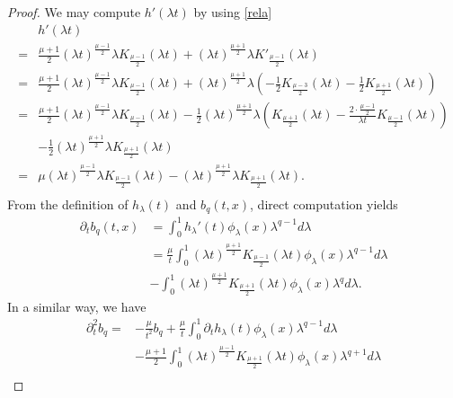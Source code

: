 \documentclass[10pt,a4paper]{amsart}
\begin{document}
\begin{proof}
We may compute $h'(\lambda t)$ by using \eqref{rela}
\begin{equation}\label{dh}
\begin{aligned}
&h'(\lambda t)\\
=&\frac{\mu+1}{2}(\lambda t)^{\frac{\mu-1}{2}}\lambda K_{\frac{\mu-1}{2}}(\lambda t)
+(\lambda t)^{\frac{\mu+1}{2}}\lambda K'_{\frac{\mu-1}{2}}(\lambda t)\\
=&\frac{\mu+1}{2}(\lambda t)^{\frac{\mu-1}{2}}\lambda K_{\frac{\mu-1}{2}}(\lambda t)+(\lambda t)^{\frac{\mu+1}{2}}\lambda
\left(-\frac12K_{\frac{\mu-3}{2}}(\lambda t)-\frac12K_{\frac{\mu+1}{2}}(\lambda t)\right)\\
=&\frac{\mu+1}{2}(\lambda t)^{\frac{\mu-1}{2}}\lambda K_{\frac{\mu-1}{2}}(\lambda t)-\frac12(\lambda t)^{\frac{\mu+1}{2}}\lambda
\left(K_{\frac{\mu+1}{2}}(\lambda t)-\frac{2\cdot\frac{\mu-1}{2}}{\lambda t}
K_{\frac{\mu-1}{2}}(\lambda t)\right)\\
&-\frac12(\lambda t)^{\frac{\mu+1}{2}}\lambda K_{\frac{\mu+1}{2}}(\lambda t)\\
=&\mu (\lambda t)^{\frac{\mu-1}{2}}\lambda K_{\frac{\mu-1}{2}}(\lambda t)-(\lambda t)^{\frac{\mu+1}{2}}\lambda K_{\frac{\mu+1}{2}}(\lambda t).\\
\end{aligned}
\end{equation}
From the definition of $h_\lambda(t)$ and $b_q(t, x)$, direct computation yields
\begin{equation}\label{l41}
\begin{aligned}
\partial_tb_q(t,x)&=\int_{0}^{1}h_\lambda'(t)\phi_\lambda(x)\lambda^{q-1}d\lambda\\
&=\frac{\mu}{t}\int_{0}^{1}(\lambda t)^{\frac{\mu+1}{2}}K_{\frac{\mu-1}{2}}(\lambda t)\phi_\lambda(x)\lambda^{q-1}d\lambda\\
&-\int_{0}^{1}(\lambda t)^{\frac{\mu+1}{2}}K_{\frac{\mu+1}{2}}(\lambda t)\phi_\lambda(x)\lambda^{q}d\lambda.
\end{aligned}
\end{equation}
In a similar way, we have
\begin{equation}\label{l42}
\begin{aligned}
\partial_t^2b_q=&-\frac{\mu}{t^2}b_q+\frac{\mu}t\int_0^1\partial_th_\lambda(t)
\phi_\lambda(x)\lambda^{q-1}d\lambda\\
&-\frac{\mu+1}{2}\int_0^1(\lambda t)^{\frac{\mu-1}{2}}K_{\frac{\mu+1}{2}}(\lambda t)\phi_\lambda(x)\lambda^{q+1}d\lambda\\

\end{aligned}
\end{equation}
\end{proof}
\end{document}
